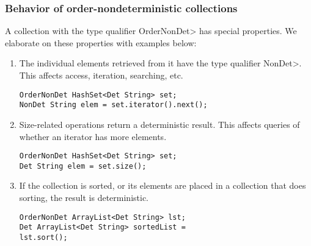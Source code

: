 \subsubsection{Behavior of order-nondeterministic collections}\label{sec:ond-behavior}
A collection with the type qualifier \<OrderNonDet> has special properties. We elaborate on these 
properties with examples below:

\begin{enumerate}
    \item
    The individual elements retrieved from it have the type qualifier \<NonDet>.  This
    affects access, iteration, searching, etc.
    \begin{Verbatim}
OrderNonDet HashSet<Det String> set; 
NonDet String elem = set.iterator().next();
    \end{Verbatim}
    \item
    Size-related operations return a deterministic result.  This affects
    queries of whether an iterator has more elements.
    \begin{Verbatim}
OrderNonDet HashSet<Det String> set; 
Det String elem = set.size();
    \end{Verbatim}
    \item
    If the collection is sorted, or its elements are placed in a collection
    that does sorting, the result is deterministic.
    \begin{Verbatim}
OrderNonDet ArrayList<Det String> lst;
Det ArrayList<Det String> sortedList = 
lst.sort();
    \end{Verbatim}
\end{enumerate}

